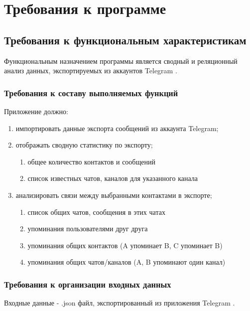 \section{Требования к программе}

\subsection{Требования к функциональным характеристикам}

Функциональным назначением программы является сводный и реляционный анализ данных, экспортируемых из аккаунтов Telegram \cite{telegram}.

\subsubsection{Требования к составу выполняемых функций}

Приложение должно: 

\begin{enumerate}
    \item импортировать данные экспорта сообщений из аккаунта Telegram;
    \item отображать сводную статистику по экспорту;
    \begin{enumerate}
        \item общее количество контактов и сообщений
        \item список известных чатов, каналов для указанного канала
    \end{enumerate}
    \item анализировать связи между выбранными контактами в экспорте;
    \begin{enumerate}
        \item список общих чатов, сообщения в этих чатах
        \item упоминания пользователями друг друга
        \item упоминания общих контактов (A упоминает B, C упоминает B)
        \item упоминания общих чатов/каналов (A, B упоминают один канал)
    \end{enumerate}
\end{enumerate}

\subsubsection{Требования к организации входных данных}

Входные данные - .json файл, экспортированный из приложения Telegram \cite{telegramExport}.

